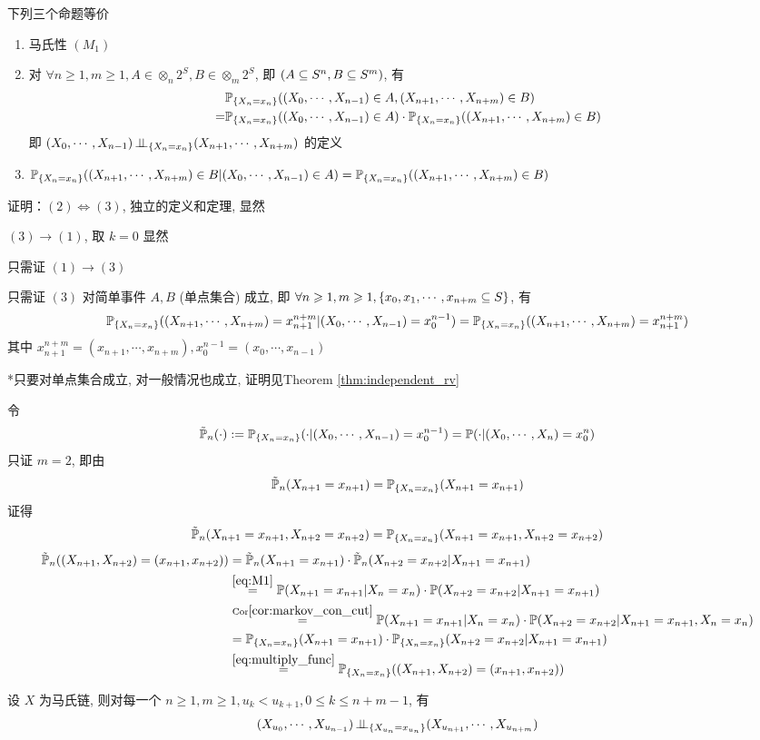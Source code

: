 \begin{property}[马氏性的等价条件]\label{prt:markov_equiv_condition}
下列三个命题等价
\begin{enumerate}
    \item 马氏性 $(M_1)$
    \item 对 $\forall n\geq 1,m\geq 1,A\in \otimes_n 2^S,B\in \otimes_m 2^S$, 即 $(A\subseteq S^n,B\subseteq S^m)$, 有
    \begin{equation}
    \begin{aligned}
        &\mathbb{P}_{\{X_n=x_n\}}((X_0,\cdots,X_{n-1})\in A,(X_{n+1},\cdots,X_{n+m})\in B)\\
        =&\mathbb{P}_{\{X_n=x_n\}}((X_0,\cdots,X_{n-1})\in A)\cdot \mathbb{P}_{\{X_n=x_n\}}((X_{n+1},\cdots,X_{n+m})\in B)
    \end{aligned}
    \label{eq:markov_equiv_condition_M2}
    \end{equation}
    即 $(X_0,\cdots,X_{n-1})\operatorname{\perp\!\!\!\perp}_{\{X_n=x_n\}}(X_{n+1},\cdots,X_{n+m})$ 的定义
    \item $\mathbb{P}_{\{X_n=x_n\}}((X_{n+1},\cdots,X_{n+m})\in B|(X_0,\cdots,X_{n-1})\in A)=\mathbb{P}_{\{X_n=x_n\}}((X_{n+1},\cdots,X_{n+m})\in B)$
\end{enumerate}
\end{property}

证明：$(2)\Leftrightarrow (3)$, 独立的定义和定理, 显然

$(3)\rightarrow (1)$, 取 $k=0$ 显然

只需证 $(1)\rightarrow (3)$

只需证 $(3)$ 对简单事件 $A,B$ (单点集合) 成立, 即 $\forall n\geqslant 1,m\geqslant 1, \{x_0,x_1,\cdots,x_{n+m}\subseteq S\}$, 有
\[
\mathbb{P}_{\{X_n=x_n\}}((X_{n+1},\cdots,X_{n+m})=x_{n+1}^{n+m}|(X_0,\cdots,X_{n-1})=x_0^{n-1})=\mathbb{P}_{\{X_n=x_n\}}((X_{n+1},\cdots,X_{n+m})=x_{n+1}^{n+m})
\]
其中 $x_{n+1}^{n+m}=(x_{n+1},\cdots,x_{n+m}),x_{0}^{n-1}=(x_0,\cdots,x_{n-1})$

*只要对单点集合成立, 对一般情况也成立, 证明见Theorem \ref{thm:independent_rv}

令
\[
\tilde{\mathbb{P}}_n(\cdot):=\mathbb{P}_{\{X_n=x_n\}}(\cdot|(X_0,\cdots,X_{n-1})=x_0^{n-1})=\mathbb{P}(\cdot|(X_0,\cdots,X_{n})=x_0^{n})
\]
只证 $m=2$, 即由
\[\tilde{\mathbb{P}}_n(X_{n+1}=x_{n+1})=\mathbb{P}_{\{X_n=x_n\}}(X_{n+1}=x_{n+1})\] 
证得
\[\tilde{\mathbb{P}}_n(X_{n+1}=x_{n+1}, X_{n+2}=x_{n+2})=\mathbb{P}_{\{X_n=x_n\}}(X_{n+1}=x_{n+1}, X_{n+2}=x_{n+2})\]
\[
\begin{aligned}
    \tilde{\mathbb{P}}_n((X_{n+1},X_{n+2})=(x_{n+1},x_{n+2}))&=\tilde{\mathbb{P}}_n(X_{n+1}=x_{n+1})\cdot \tilde{\mathbb{P}}_n(X_{n+2}=x_{n+2}|X_{n+1}=x_{n+1})\\
    &\overset{\eqref{eq:M1}}{=}\mathbb{P}(X_{n+1}=x_{n+1}|X_n=x_n)\cdot \mathbb{P}(X_{n+2}=x_{n+2}|X_{n+1}=x_{n+1})\\
    &\overset{\text{Cor}\eqref{cor:markov_con_cut}}{=}\mathbb{P}(X_{n+1}=x_{n+1}|X_n=x_n)\cdot \mathbb{P}(X_{n+2}=x_{n+2}|X_{n+1}=x_{n+1},X_n=x_n)\\
    &=\mathbb{P}_{\{X_n=x_n\}}(X_{n+1}=x_{n+1})\cdot \mathbb{P}_{\{X_n=x_n\}}(X_{n+2}=x_{n+2}|X_{n+1}=x_{n+1})\\
    &\overset{\eqref{eq:multiply_func}}{=}\mathbb{P}_{\{X_n=x_n\}}((X_{n+1},X_{n+2})=(x_{n+1},x_{n+2}))
\end{aligned}
\]

\begin{corollary}
    设 $X$ 为马氏链, 则对每一个 $n\geq 1,m\geq 1, u_k<u_{k+1}, 0\leq k\leq n+m-1$, 有
    \[
    (X_{u_0},\cdots,X_{u_{n-1}})\operatorname{\perp\!\!\!\perp}_{\{X_{u_n}=x_{u_n}\}}(X_{u_{n+1}},\cdots,X_{u_{n+m}})
    \]
\end{corollary}

\newpage
